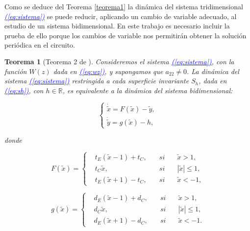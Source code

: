 \documentclass[12pt,a4paper]{report} %
\newtheorem{theorem}{Teorema}[chapter]
\newcommand{\eref}[1]{\hyperref[#1]{\textcolor{blue}{\textit{(\ref*{#1})}}}}
\begin{document}
	\vspace{0.5cm}Como se deduce del Teorema \ref{teorema1} la dinámica del sistema tridimensional \eref{eq:sistema} se puede reducir, aplicando un cambio de variable adecuado, al estudio de un sistema bidimensional. En este trabajo es necesario incluir la prueba de ello porque los cambios de variable nos permitirán obtener la solución periódica en el circuito.
	
	\newpage
	
	\begin{theorem}[Teorema 2 de \cite{ponce}]
		Consideremos el sistema \eref{eq:sistema}, con la función $W(z)$ dada en \eref{eq:wz}, y supongamos que $a_{22}\neq 0$. La dinámica del sistema \eref{eq:sistema} restringida a cada superficie invariante $S_h$, dada en \eref{eq:sh}, con $h \in \mathbb{R}$, es equivalente a la dinámica del sistema bidimensional:
		
		\begin{equation}
			\label{eq:sis2ec}
			\left\{
			\begin{gathered}
				\dot{\tilde{x}}=F(\tilde{x})-\tilde{y}, \\[2mm]
				\dot{\tilde{y}}=g(\tilde{x})-h,
			\end{gathered}
			\right.
		\end{equation}
		
		donde
		
		\begin{equation}
			\label{eq:f1}
			F(\tilde{x})=
			\left\{
			\begin{aligned}
				&t_E(\tilde{x}-1)+t_C, \quad &si& \quad \tilde{x}>1,\\
				&t_C\tilde{x}, &si& \quad |\tilde{x}|\leq 1,\\
				&t_E(\tilde{x}+1)-t_C, \quad &si& \quad \tilde{x}<-1,
			\end{aligned}
			\right.
		\end{equation}\smallskip
		
		\begin{equation}
			\label{eq:g1}
			g(\tilde{x})=
			\left\{
			\begin{aligned}
				&d_E(\tilde{x}-1)+d_C, \quad &si& \quad \tilde{x}>1,\\
				&d_C\tilde{x}, &si& \quad |\tilde{x}|\leq 1,\\
				&d_E(\tilde{x}+1)-d_C, \quad &si& \quad \tilde{x}<-1.
			\end{aligned}
			\right.
		\end{equation}\smallskip
		
	\end{theorem}
	
\end{document}
